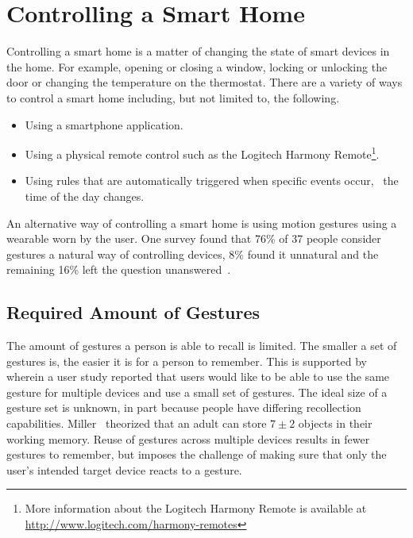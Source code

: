 \section{Controlling a Smart Home}
\label{sec:introduction:gesture-control}

Controlling a smart home is a matter of changing the state of smart devices in the home. For example, opening or closing a window, locking or unlocking the door or changing the temperature on the thermostat. There are a variety of ways to control a smart home including, but not limited to, the following.

\begin{itemize}
\item Using a smartphone application.
\item Using a physical remote control such as the Logitech Harmony Remote\footnote{More information about the Logitech Harmony Remote is available at \url{http://www.logitech.com/harmony-remotes}}.
\item Using rules that are automatically triggered when specific events occur, \eg~the time of the day changes.
\end{itemize}

An alternative way of controlling a smart home is using motion gestures using a wearable worn by the user. One survey found that 76\% of 37 people consider gestures a natural way of controlling devices, 8\% found it unnatural and the remaining 16\% left the question unanswered~\cite{Kela2006}.

\subsection{Required Amount of Gestures}

The amount of gestures a person is able to recall is limited. The smaller a set of gestures is, the easier it is for a person to remember. This is supported by~\cite{Kela2006} wherein a user study reported that users would like to be able to use the same gesture for multiple devices and use a small set of gestures.
The ideal size of a gesture set is unknown, in part because people have differing recollection capabilities. Miller~\cite{miller1956magical} theorized that an adult can store $7 \pm 2$ objects in their working memory.
Reuse of gestures across multiple devices results in fewer gestures to remember, but imposes the challenge of making sure that only the user's intended target device reacts to a gesture.

